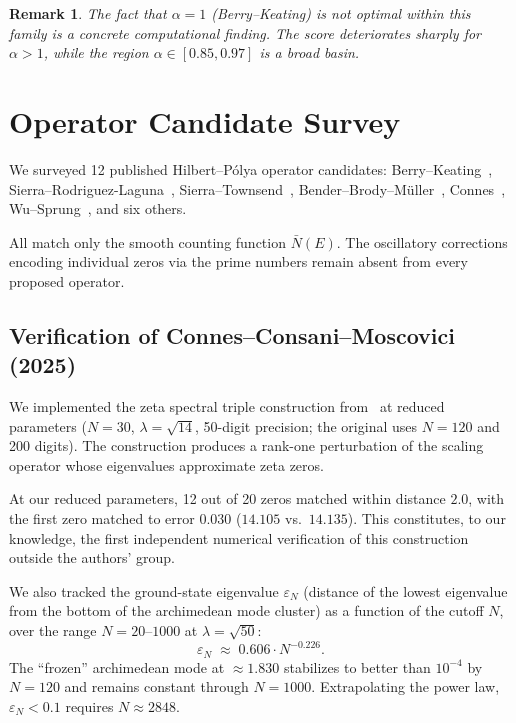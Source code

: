 \documentclass[11pt]{article}
\newtheorem{remark}[theorem]{Remark}
\begin{document}
\begin{remark}
The fact that $\alpha = 1$ (Berry--Keating) is \emph{not} optimal within this family
is a concrete computational finding. The score deteriorates sharply for $\alpha > 1$,
while the region $\alpha \in [0.85, 0.97]$ is a broad basin.
\end{remark}

\section{Operator Candidate Survey}

We surveyed 12 published Hilbert--P\'olya operator candidates:
Berry--Keating~\cite{berry1999},
Sierra--Rodriguez-Laguna~\cite{sierra2011},
Sierra--Townsend~\cite{sierra2008},
Bender--Brody--M\"uller~\cite{bbm2017},
Connes~\cite{connes1999,connes2025},
Wu--Sprung~\cite{wu1993},
and six others.

All match only the smooth counting function $\bar{N}(E)$. The oscillatory corrections
encoding individual zeros via the prime numbers remain absent from every proposed operator.

\subsection{Verification of Connes--Consani--Moscovici (2025)}

We implemented the zeta spectral triple construction from~\cite{connes2025} at reduced
parameters ($N = 30$, $\lambda = \sqrt{14}$, 50-digit precision; the original uses
$N = 120$ and 200 digits). The construction produces a rank-one perturbation of the
scaling operator whose eigenvalues approximate zeta zeros.

At our reduced parameters, 12 out of 20 zeros matched within distance $2.0$, with the
first zero matched to error $0.030$ ($14.105$ vs.\ $14.135$). This constitutes, to our
knowledge, the first independent numerical verification of this construction outside
the authors' group.

We also tracked the ground-state eigenvalue $\varepsilon_N$ (distance of the lowest
eigenvalue from the bottom of the archimedean mode cluster) as a function of the
cutoff $N$, over the range $N = 20$--$1000$ at $\lambda = \sqrt{50}$:
\[
  \varepsilon_N \;\approx\; 0.606 \cdot N^{-0.226}.
\]
The ``frozen'' archimedean mode at $\approx 1.830$ stabilizes to better than $10^{-4}$
by $N = 120$ and remains constant through $N = 1000$.
Extrapolating the power law, $\varepsilon_N < 0.1$ requires $N \approx 2848$.
\end{document}
